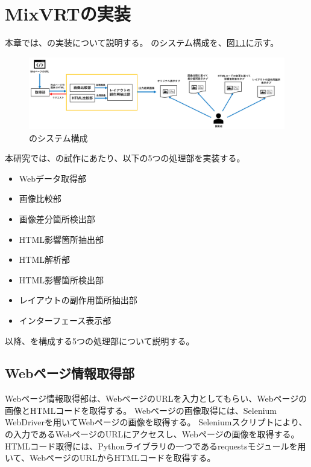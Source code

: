 \chapter{MixVRTの実装}\label{cha:Implementation}
本章では、\toolName の実装について説明する。
\toolName のシステム構成を、図\ref{fig:System}に示す。
\begin{figure}[tp]
    \begin{center}
        \includegraphics[width=1.0\columnwidth]{image/4_System.png}
        \caption{\toolName のシステム構成}
        \label{fig:System}
    \end{center}
\end{figure}
本研究では、\toolName の試作にあたり、以下の5つの処理部を実装する。
\begin{itemize}
    \item Webデータ取得部
    \item 画像比較部
    \item 画像差分箇所検出部
    \item HTML影響箇所抽出部
    \item HTML解析部
    \item HTML影響箇所検出部
    \item レイアウトの副作用箇所抽出部
    \item インターフェース表示部
\end{itemize}
以降、\toolName を構成する5つの処理部について説明する。
\par



\section{Webページ情報取得部}\label{sec:Web_page_information_get_section}
Webページ情報取得部は、WebページのURLを入力としてもらい、Webページの画像とHTMLコードを取得する。
Webページの画像取得には、Selenium WebDriverを用いてWebページの画像を取得する。
Seleniumスクリプトにより、\toolName の入力であるWebページのURLにアクセスし、Webページの画像を取得する。
HTMLコード取得には、Pythonライブラリの一つであるrequestsモジュールを用いて、WebページのURLからHTMLコードを取得する。


